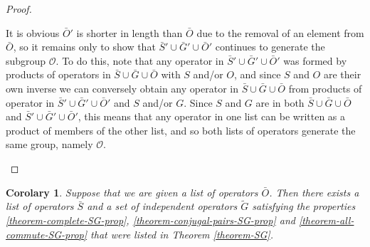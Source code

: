 \documentclass[twocolumn,showpacs,preprintnumbers,amsmath,amssymb,nofootinbib,pra,floatfix]{revtex4}
\newtheorem{corolary}{Corolary}
\begin{document}
\begin{proof}
\begin{description}
It is obvious $\bar O'$ is shorter in length than $\bar O$ due to the removal of an element from $\bar O$, so it remains only to show that $\bar S' \cup \bar G' \cup \bar O'$ continues to generate the subgroup $\mathcal{O}$.  To do this, note that any operator in $\bar S' \cup \bar G' \cup \bar O'$ was formed by products of operators in $\bar S \cup \bar G \cup \bar O$ with $S$ and/or $O$, and since $S$ and $O$ are their own inverse we can conversely obtain any operator in $\bar S \cup \bar G \cup \bar O$ from products of operator in $\bar S' \cup \bar G' \cup \bar O'$ and $S$ and/or $G$.  Since $S$ and $G$ are in both $\bar S \cup \bar G \cup \bar O$ and $\bar S' \cup \bar G' \cup \bar O'$, this means that any operator in one list can be written as a product of members of the other list, and so both lists of operators generate the same group, namely $\mathcal{O}$.
\end{description}
\end{proof}

\begin{corolary}
\label{corolary-SG}
Suppose that we are given a list of operators $\bar O$.  Then there exists a list of operators $\bar S$ and a set of independent operators $\tilde G$ satisfying the properties \ref{theorem-complete-SG-prop}, \ref{theorem-conjugal-pairs-SG-prop} and \ref{theorem-all-commute-SG-prop} that were listed in Theorem \ref{theorem-SG}.
\end{corolary}
\end{document}
